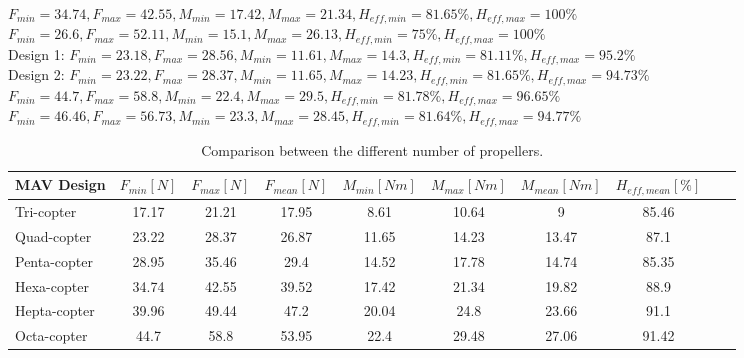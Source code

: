 $F_{min} = 34.74, F_{max} = 42.55 , M_{min} = 17.42,  M_{max} = 21.34,  H_{eff,min} = 81.65\%,  H_{eff,max} = 100\%$\\
$F_{min} = 26.6, F_{max} = 52.11 , M_{min} = 15.1,  M_{max} = 26.13,  H_{eff,min} = 75\%,  H_{eff,max} = 100\%$\\
Design 1: $F_{min} = 23.18, F_{max} = 28.56 , M_{min} = 11.61,  M_{max} = 14.3,  H_{eff,min} = 81.11\%,  H_{eff,max} = 95.2\%$\\
Design 2: $F_{min} = 23.22, F_{max} = 28.37 , M_{min} = 11.65,  M_{max} = 14.23,  H_{eff,min} = 81.65\%, H_{eff,max} = 94.73\%$\\
$F_{min} = 44.7, F_{max} = 58.8 , M_{min} = 22.4,  M_{max} = 29.5,  H_{eff,min} = 81.78\%,  H_{eff,max} = 96.65\%$\\
$F_{min} = 46.46, F_{max} = 56.73 , M_{min} = 23.3,  M_{max} = 28.45,  H_{eff,min} = 81.64\%, H_{eff,max} = 94.77\%$\\

\begin{table}[h]
\begin{center}
 \caption{Comparison between the different number of propellers.}\vspace{1ex}
 \label{tab:tabnefz}
 \begin{tabular}{l|ccccccccc}
 \hline
 MAV Design & $F_{min} [N]$ & $F_{max} [N]$ & $F_{mean} [N]$ & $M_{min} [Nm]$ & $M_{max} [Nm]$ & $M_{mean} [Nm]$ & $H_{eff,mean} [\%]$ \\ \hline \hline
 Tri-copter  & 17.17 & 21.21 & 17.95 & 8.61 & 10.64 & 9 & 85.46\\
 Quad-copter & 23.22 & 28.37 & 26.87 & 11.65 & 14.23 & 13.47& 87.1 \\
 Penta-copter  & 28.95 & 35.46 & 29.4 & 14.52 & 17.78 & 14.74 & 85.35\\
 Hexa-copter  & 34.74 & 42.55 & 39.52 & 17.42 & 21.34 & 19.82 & 88.9\\
 Hepta-copter  & 39.96 & 49.44 & 47.2 & 20.04 & 24.8 & 23.66 & 91.1\\
 Octa-copter  & 44.7 & 58.8 & 53.95 & 22.4 & 29.48 & 27.06 & 91.42\\
 \hline
 \end{tabular}
\end{center}
\end{table}
